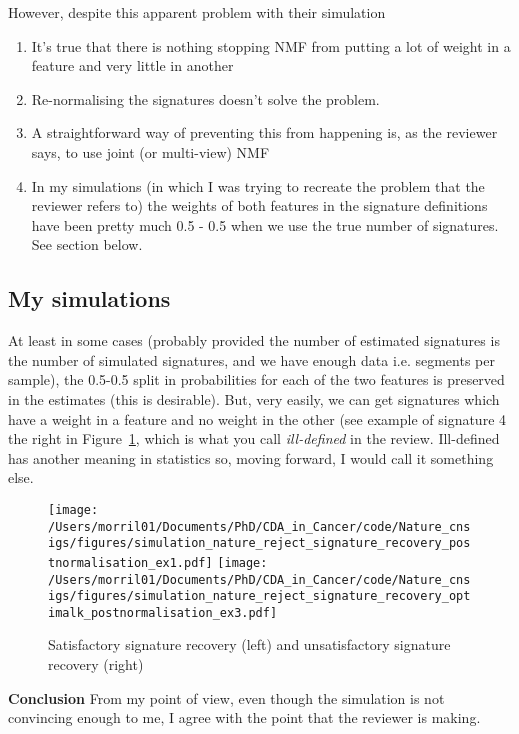 \documentclass[11pt,a4paper,roman]{article}
\begin{document}
However, despite this apparent problem with their simulation
\begin{enumerate}
\item It's true that there is nothing stopping NMF from putting a lot of weight in a feature and very little in another
\item Re-normalising the signatures doesn't solve the problem.
\item A straightforward way of preventing this from happening is, as the reviewer says, to use joint (or multi-view) NMF
\item In my simulations (in which I was trying to recreate the problem that the reviewer refers to) the weights of both features in the signature definitions have been pretty much 0.5 - 0.5 when we use the true number of signatures. See section below.
\end{enumerate}

\subsection{My simulations}

At least in some cases (probably provided the number of estimated signatures is the number of simulated signatures, and we have enough data i.e. segments per sample), the 0.5-0.5 split in probabilities for each of the two features is preserved in the estimates (this is desirable). But, very easily, we can get signatures which have a weight in a feature and no weight in the other (see example of signature 4 the right in Figure~\ref{mysim}, which is what you call \emph{ill-defined} in the review. Ill-defined has another meaning in statistics so, moving forward, I would call it something else.

\begin{figure}[h]
\centering
\texttt{[image: /Users/morril01/Documents/PhD/CDA\_in\_Cancer/code/Nature\_cnsigs/figures/simulation\_nature\_reject\_signature\_recovery\_postnormalisation\_ex1.pdf]}
\texttt{[image: /Users/morril01/Documents/PhD/CDA\_in\_Cancer/code/Nature\_cnsigs/figures/simulation\_nature\_reject\_signature\_recovery\_optimalk\_postnormalisation\_ex3.pdf]}
\caption{Satisfactory signature recovery (left) and unsatisfactory signature recovery (right)\label{mysim}}
\end{figure}

\textbf{Conclusion} From my point of view, even though the simulation is not convincing enough to me, I agree with the point that the reviewer is making.
\end{document}
